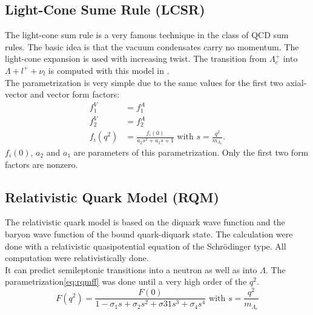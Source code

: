 \subsection{Light-Cone Sume Rule (LCSR)}
The light-cone sum rule is a very famous technique in the class of QCD sum 
rules{\cite{LCSR}}. The basic idea is that the vacuum condensates carry no momentum. 
The light-cone expansion is used with increasing twist. The transition from 
\(\Lambda_c^+\) into \(\Lambda + l^+ + \nu_l\) is computed with this model in
{\cite{LCSR}}.\\
The parametrization is very simple due to  the same values for the 
first two axial-vector and vector form factors:
\begin{align}
  f^V_1 & = f^A_1 \nonumber \\
  f^V_2 & = f^A_2 \nonumber \\
  f_i(q^2) & = \frac{f_i(0)}{a_2 s^2 + a_1 s + 1 } \text{ with } s = \frac{q^2}{m_{\Lambda_c}}. \label{eq:lcsrff}
\end{align}
\(f_i(0)\), \(a_2\) and \(a_1\) are parameters of this parametrization. Only the 
first two form factors are nonzero.

\subsection{Relativistic Quark Model (RQM)}
The relativistic quark model{\cite{RQM}} is based on the diquark wave function 
and the baryon wave function of the bound quark-diquark state. The calculation 
were done with a relativistic quasipotential equation of the Schr\"{o}dinger type.
All computation were relativistically done.\\
It can predict semileptonic transitions into a neutron as well as into \(\Lambda\).
The parametrization{\eqref{eq:rqmff}} was done until a very high order of the 
\(q^2\).
\begin{equation}
  F(q^2) = \frac{F(0)}{1 - \sigma_1 s + \sigma_2 s^2 + \sigma31 s^3 + \sigma_4 s^4} 
  \text{ with } s = \frac{q^2}{m_{\Lambda_c}} \label{eq:rqmff}
\end{equation}

